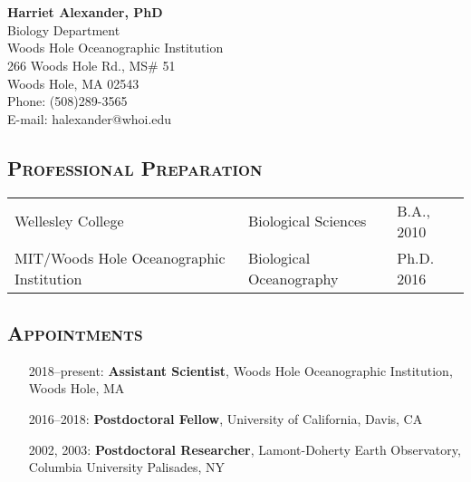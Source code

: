 \documentclass[svgnames,11pt]{article}
\date{}
\author{}
\begin{document}

\section*{}
\textbf{\large{Harriet Alexander, PhD}}\\
Biology Department\\
Woods Hole Oceanographic Institution\\
266 Woods Hole Rd., MS\# 51\\
Woods Hole, MA 02543\\
Phone: (508)289-3565\\
E-mail: halexander@whoi.edu\\


\subsection*{\textsc{Professional Preparation}}

\begin{tabular}{ l l l }
 Wellesley College & Biological Sciences & B.A., 2010 \\
 MIT/Woods Hole Oceanographic Institution & Biological Oceanography & Ph.D. 2016 \\
\end{tabular}


\subsection*{\textsc{Appointments}}

\begin{itemize}[label={--9999:},leftmargin=*,itemsep=0pt]

    \item[2018--present:]
        \textbf{Assistant Scientist},
        Woods Hole Oceanographic Institution,
        Woods Hole, MA

    \item[2016--2018:]
        \textbf{Postdoctoral Fellow},
        University of California, Davis, CA

    \item[2002, 2003:]
        \textbf{Postdoctoral Researcher},
        Lamont-Doherty Earth Observatory, Columbia University
        Palisades, NY

\end{itemize}
\end{document}
